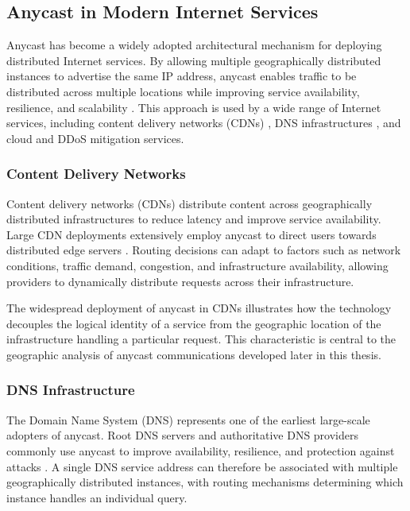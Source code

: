 \subsection{Anycast in Modern Internet Services}
\label{sc:background_internet_routing_anycast_modern}

Anycast has become a widely adopted architectural mechanism for deploying distributed Internet services. By allowing multiple geographically distributed instances to advertise the same IP address, anycast enables traffic to be distributed across multiple locations while improving service availability, resilience, and scalability \cite{Hinden2003InternetArchitecture,McPherson2014ArchitecturalAnycast}. This approach is used by a wide range of Internet services, including content delivery networks (CDNs) \cite{Calder2015AnalyzingCDN}, DNS infrastructures \cite{Abley2006OperationServices}, and cloud and DDoS mitigation services.

\subsubsection{Content Delivery Networks}
\label{sc:background_internet_routing_anycast_modern_cdns}

Content delivery networks (CDNs) distribute content across geographically distributed infrastructures to reduce latency and improve service availability. Large CDN deployments extensively employ anycast to direct users towards distributed edge servers \cite{Calder2015AnalyzingCDN}. Routing decisions can adapt to factors such as network conditions, traffic demand, congestion, and infrastructure availability, allowing providers to dynamically distribute requests across their infrastructure.

The widespread deployment of anycast in CDNs illustrates how the technology decouples the logical identity of a service from the geographic location of the infrastructure handling a particular request. This characteristic is central to the geographic analysis of anycast communications developed later in this thesis.

\subsubsection{DNS Infrastructure}
\label{sc:background_internet_routing_anycast_modern_dns}

The Domain Name System (DNS) represents one of the earliest large-scale adopters of anycast. Root DNS servers and authoritative DNS providers commonly use anycast to improve availability, resilience, and protection against attacks \cite{Abley2006OperationServices}. A single DNS service address can therefore be associated with multiple geographically distributed instances, with routing mechanisms determining which instance handles an individual query.

